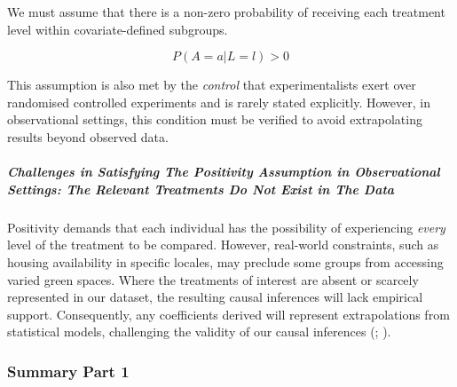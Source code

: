\documentclass[
  singlecolumn]{article}
\let\oldsubparagraph\subparagraph
\renewcommand{\subparagraph}[1]{\oldsubparagraph{#1}\mbox{}}
\begin{document}
We must assume that there is a non-zero probability of receiving each
treatment level within covariate-defined subgroups.

\[
P(A = a | L= l) > 0
\]

This assumption is also met by the \emph{control} that experimentalists
exert over randomised controlled experiments and is rarely stated
explicitly. However, in observational settings, this condition must be
verified to avoid extrapolating results beyond observed data.

\subparagraph{Challenges in Satisfying The Positivity Assumption in
Observational Settings: The Relevant Treatments Do Not Exist in The
Data}\label{challenges-in-satisfying-the-positivity-assumption-in-observational-settings-the-relevant-treatments-do-not-exist-in-the-data}

Positivity demands that each individual has the possibility of
experiencing \emph{every} level of the treatment to be compared.
However, real-world constraints, such as housing availability in
specific locales, may preclude some groups from accessing varied green
spaces. Where the treatments of interest are absent or scarcely
represented in our dataset, the resulting causal inferences will lack
empirical support. Consequently, any coefficients derived will represent
extrapolations from statistical models, challenging the validity of our
causal inferences (;
).

\subsubsection{Summary Part 1}\label{summary-part-1}
\end{document}
